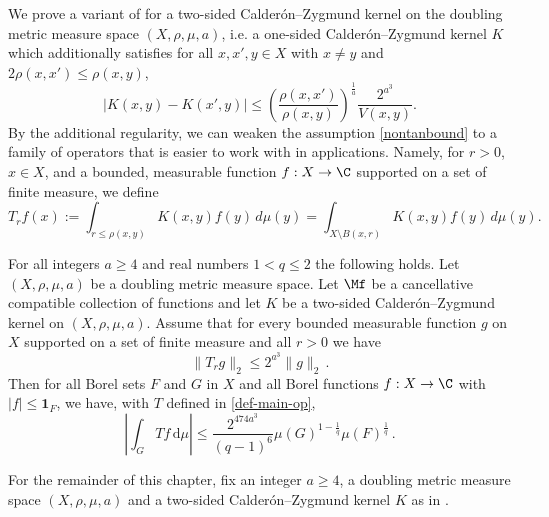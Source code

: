 We prove a variant of  for a two-sided Calder\'on--Zygmund kernel on the doubling metric measure space $(X,\rho,\mu,a)$, i.e. a one-sided Calder\'on--Zygmund kernel $K$ which additionally satisfies for all $x,x',y\in X$ with $x\neq y$ and $2\rho(x,x') \leq \rho(x,y)$,
\begin{equation}
    \label{eqkernel-x-smooth}
    |K(x,y) - K(x',y)| \leq \left(\frac{\rho(x,x')}{\rho(x,y)}\right)^{\frac{1}{a}}\frac{2^{a^3}}{V(x,y)}.
\end{equation}
By the additional regularity, we can weaken the assumption \eqref{nontanbound} to a family of operators that is easier to work with in applications.
Namely, for $r > 0$, $x\in X$, and a bounded, measurable function $f:X\to\C$ supported on a set of finite measure, we define
\begin{equation}
\label{def-T-r}
T_r f(x):= \int_{r\le\rho(x,y)} K(x,y) f(y) \, d\mu(y) = \int_{X\setminus B(x,r)} K(x,y) f(y) \, d\mu(y).
\end{equation}
\begin{theorem}
    \label{two-sided-metric-space-Carleson}
    \leanok
        For all  integers $a \ge  4$ and real numbers $1<q\le 2$
        the following holds.
        Let $(X,\rho,\mu,a)$ be a doubling metric measure space. Let  $\Mf$ be a
        cancellative compatible  collection of functions and let $K$ be a two-sided Calder\'on--Zygmund kernel on $(X,\rho,\mu,a)$. Assume  that for every bounded measurable function $g$ on $X$ supported on a set of finite measure and all $r>0$ we have
      \begin{equation}\label{two-sided-Hr-bound-assumption}
            \|T_r g\|_{2} \leq 2^{a^3} \|g\|_2\,.
        \end{equation}
        Then for all Borel sets $F$ and $G$ in $X$ and
        all Borel functions $f:X\to \C$ with
        $|f|\le \mathbf{1}_F$, we have, with $T$ defined in \eqref{def-main-op},
      \begin{equation}
        \label{two-sided-resweak}
            \left|\int_{G} T f \, \mathrm{d}\mu\right| \leq \frac{2^{474a^3}}{(q-1)^6} \mu(G)^{1-\frac{1}{q}} \mu(F)^{\frac{1}{q}}\, .
        \end{equation}
\end{theorem}

For the remainder of this chapter, fix an integer $a\ge 4$, a doubling metric measure space $(X,\rho,\mu,a)$ and a two-sided Calder\'on--Zygmund kernel $K$ as in .

